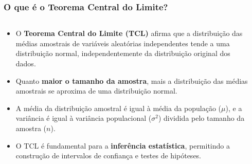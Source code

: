\documentclass[aspectratio=169,12pt]{beamer}
\begin{document}
\begin{frame}
    \frametitle{O que é o Teorema Central do Limite?}
    
    \begin{columns}
        \begin{column}{0.6\textwidth}
            \begin{itemize}
                \item[\faIcon{info-circle}] O \textcolor{azulprincipal}{\textbf{Teorema Central do Limite (TCL)}} afirma que a distribuição das médias amostrais de variáveis aleatórias independentes tende a uma distribuição normal, independentemente da distribuição original dos dados.
                \vspace{0.3cm}
                
                \item[\faIcon{star}] Quanto \textcolor{azulprincipal}{\textbf{maior o tamanho da amostra}}, mais a distribuição das médias amostrais se aproxima de uma distribuição normal.
                \vspace{0.3cm}
                
                \item[\faIcon{chart-line}] A média da distribuição amostral é igual à média da população ($\mu$), e a variância é igual à variância populacional ($\sigma^2$) dividida pelo tamanho da amostra ($n$).
                \vspace{0.3cm}
                
                \item[\faIcon{cogs}] O TCL é fundamental para a \textcolor{azulprincipal}{\textbf{inferência estatística}}, permitindo a construção de intervalos de confiança e testes de hipóteses.
            \end{itemize}
        \end{column}
        
        \begin{column}{0.4\textwidth}
            \begin{center}
                

\end{center}
\end{column}
\end{columns}
\end{frame}
\end{document}
